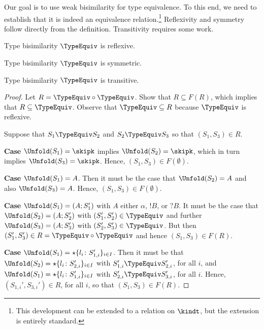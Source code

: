 Our goal is to use weak bisimilarity for type
equivalence. To this end, we need to establish that it is indeed an
equivalence relation.\footnote{This development can be extended to a
  relation on $\kindt$, but the extension is entirely standard.}
Reflexivity and symmetry follow directly from the definition. Transitivity requires some work.



\begin{lemma}
  Type  bisimilarity $\TypeEquiv$ is reflexive.
\end{lemma}

\begin{lemma}
  Type bisimilarity $\TypeEquiv$ is symmetric.
\end{lemma}

\begin{lemma}
  Type bisimilarity $\TypeEquiv$ is transitive.
\end{lemma}
\begin{proof}
  Let $R  = {\TypeEquiv} \circ {\TypeEquiv}$. Show that $R \subseteq F(R)$, which implies that $R
  \subseteq {\TypeEquiv}$. Observe that ${\TypeEquiv}
  \subseteq R$ because $\TypeEquiv$ is reflexive.

  Suppose that $S_1 \TypeEquiv S_2$ and $S_2 \TypeEquiv S_3$ so that $(S_1, S_3) \in R$.

  \textbf{Case }$\Unfold (S_1) = \skipk$ implies $\Unfold (S_2) =\skipk$, which in turn implies $\Unfold (S_3) =
  \skipk$. Hence, $(S_1, S_3) \in F (\emptyset)$.

  \textbf{Case }$\Unfold (S_1) = A$. Then it must be the case that
  $\Unfold (S_2) = A$ and also $\Unfold (S_3)=A$. Hence, $(S_1, S_3)
  \in F (\emptyset)$.

  \textbf{Case }$\Unfold (S_1) = (A; S_1')$ with $A$ either $\alpha$, $!B$, or $?B$. It must be the
  case that $\Unfold (S_2) = (A; S_2')$ with $(S_1', S_2') \in {\TypeEquiv}$ and further
  $\Unfold (S_3) = (A; S_3')$ with $(S_2', S_3') \in {\TypeEquiv}$. But then $(S_1', S_3') \in R =
  {\TypeEquiv} \circ {\TypeEquiv}$ and hence $(S_1, S_3) \in F (R)$.

  \textbf{Case }$\Unfold (S_1) = \star\{l_i\colon S_{1,i}'\}_{i\in I}$. Then it must be that
  $\Unfold (S_2) = \star\{l_i\colon S_{2,i}'\}_{i\in I}$ with $S_{1,i}' \TypeEquiv S_{2,i}'$, for all
  $i$, and $\Unfold (S_1) = \star\{l_i\colon S_{1,i}'\}_{i\in I}$ with  $S_{2,i}' \TypeEquiv S_{3,i}'$, for all
  $i$. Hence, $(S_{1,i}', S_{3,i}') \in R $, for all $i$, so that $(S_1, S_3) \in F (R)$.
\end{proof}

